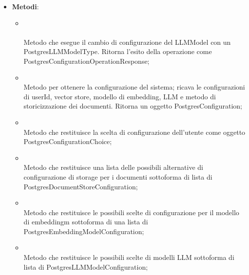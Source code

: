 \documentclass[10pt, a4paper]{article}
\begin{document}
    \label{PostgresConfigurationORMDettaglio}
    \begin{itemize}
        \item \textbf{Metodi}:
        \begin{itemize}
            \item {}\\ \\
            Metodo che esegue il cambio di configurazione del LLMModel con un PostgresLLMModelType. Ritorna l'esito della operazione come PostgresConfigurationOperationResponse;

            \item {}\\
            Metodo per ottenere la configurazione del sistema; ricava le configurazioni di userId, vector store, modello di embedding, LLM e metodo di storicizzazione dei documenti. Ritorna un oggetto PostgresConfiguration;
            
            \item {}\\
            Metodo che restituisce la scelta di configurazione dell'utente come oggetto PostgresConfigurationChoice;

            \item {}\\
            Metodo che restituisce una lista delle possibili alternative di configurazione di storage per i documenti sottoforma di lista di PostgresDocumentStoreConfiguration;

            \item {}\\
            Metodo che restituisce le possibili scelte di configurazione per il modello di embeddingm sottoforma di una lista di PostgresEmbeddingModelConfiguration;

            \item {}\\
            Metodo che restituisce le possibili scelte di modelli LLM sottoforma di  lista di PostgresLLMModelConfiguration;


\end{itemize}
\end{itemize}
\end{document}
